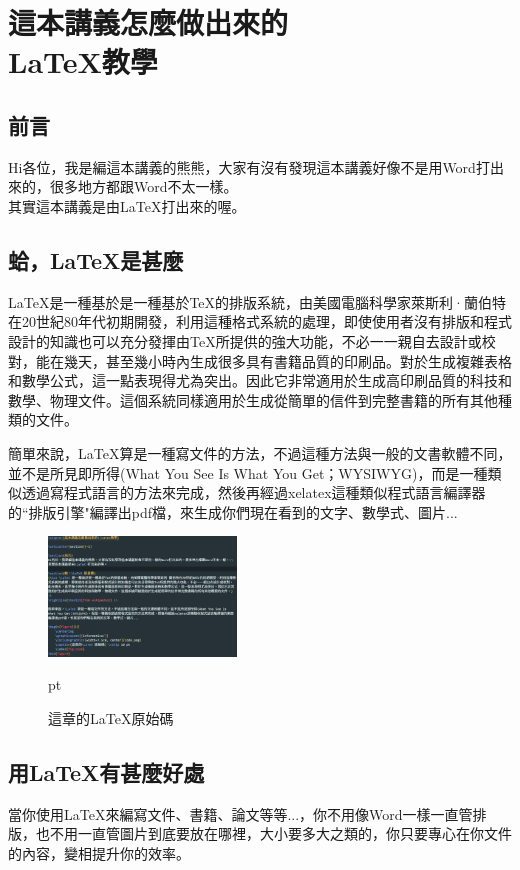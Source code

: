 \chapter{這本講義怎麼做出來的 \\ \LaTeX 教學}
\setcounter{section}{-1}
\section{前言}
Hi各位，我是編這本講義的熊熊，大家有沒有發現這本講義好像不是用Word打出來的，很多地方都跟Word不太一樣。\\
其實這本講義是由\LaTeX 打出來的喔。
\section{蛤，\LaTeX 是甚麼}
{\Kai \LaTeX 是一種基於是一種基於TeX的排版系統，由美國電腦科學家萊斯利·蘭伯特在20世紀80年代初期開發，利用這種格式系統的處理，即使使用者沒有排版和程式設計的知識也可以充分發揮由TeX所提供的強大功能，不必一一親自去設計或校對，能在幾天，甚至幾小時內生成很多具有書籍品質的印刷品。對於生成複雜表格和數學公式，這一點表現得尤為突出。因此它非常適用於生成高印刷品質的科技和數學、物理文件。這個系統同樣適用於生成從簡單的信件到完整書籍的所有其他種類的文件。}\\

簡單來說，\LaTeX 算是一種寫文件的方法，不過這種方法與一般的文書軟體不同，並不是所見即所得(What You See Is What You Get；WYSIWYG)，而是一種類似透過寫程式語言的方法來完成，然後再經過xelatex這種類似程式語言編譯器的``排版引擎"編譯出pdf檔，來生成你們現在看到的文字、數學式、圖片...
\begin{figure}[H]
    \centering
    \graphicspath{{informatics/}}
    \includegraphics[width=5cm, center]{code.png}
    \caption{這章的\LaTeX 原始碼}  pt
    \label{fig:code}
\end{figure}

\section{用\LaTeX 有甚麼好處}
當你使用\LaTeX 來編寫文件、書籍、論文等等...，你不用像Word一樣一直管排版，也不用一直管圖片到底要放在哪裡，大小要多大之類的，你只要專心在你文件的內容，變相提升你的效率。

